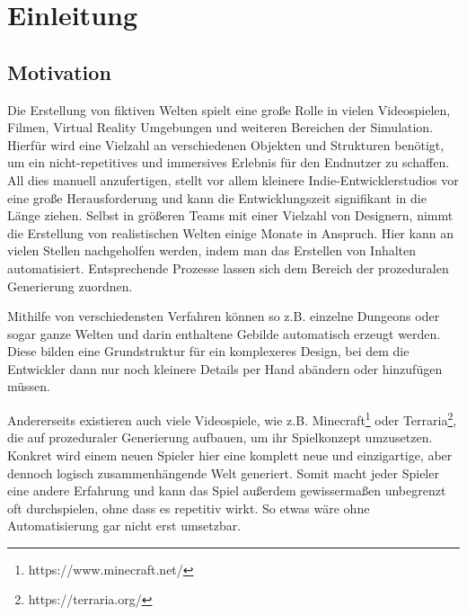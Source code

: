 %
\chapter{Einleitung}

\section{Motivation}
Die Erstellung von fiktiven Welten spielt eine große Rolle in vielen Videospielen, Filmen, Virtual Reality Umgebungen
und weiteren Bereichen der Simulation. Hierfür wird eine Vielzahl an verschiedenen Objekten und Strukturen benötigt, um
ein nicht-repetitives und immersives Erlebnis für den Endnutzer zu schaffen. All dies manuell anzufertigen, stellt vor
allem kleinere Indie-Entwicklerstudios vor eine große Herausforderung und kann die Entwicklungszeit signifikant in die
Länge ziehen. Selbst in größeren Teams mit einer Vielzahl von Designern, nimmt die Erstellung von realistischen Welten
einige Monate in Anspruch. \cite{10_freiknecht} Hier kann an vielen Stellen nachgeholfen werden, indem man das Erstellen
von Inhalten automatisiert. Entsprechende Prozesse lassen sich dem Bereich der prozeduralen Generierung zuordnen.

Mithilfe von verschiedensten Verfahren können so z.B. einzelne Dungeons oder sogar ganze Welten und darin enthaltene Gebilde
automatisch erzeugt werden. Diese bilden eine Grundstruktur für ein komplexeres Design, bei dem die Entwickler dann nur noch
kleinere Details per Hand abändern oder hinzufügen müssen.

Andererseits existieren auch viele Videospiele, wie z.B. Minecraft\footnote{https://www.minecraft.net/} oder
Terraria\footnote{https://terraria.org/}, die auf prozeduraler Generierung aufbauen, um ihr Spielkonzept umzusetzen.
Konkret wird einem neuen Spieler hier eine komplett neue und einzigartige, aber dennoch logisch
zusammenhängende Welt generiert. Somit macht jeder Spieler eine andere Erfahrung und kann das Spiel außerdem gewissermaßen
unbegrenzt oft durchspielen, ohne dass es repetitiv wirkt. So etwas wäre ohne Automatisierung gar nicht erst umsetzbar.

